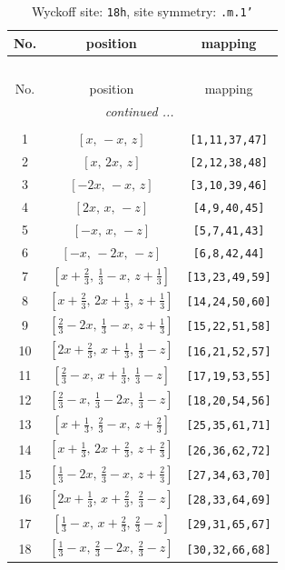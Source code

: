 \documentclass[fleqn,8pt]{jsarticle}
\begin{document}
\renewcommand{\arraystretch}{1.2}
\begin{longtable}{ccc}
\caption{Wyckoff site: {\tt 18h}, site symmetry: {\tt .m.1'}}
 \\
 \hline \hline
No. & position & mapping \\ \hline \endfirsthead

\multicolumn{2}{l}{\tablename\ \thetable{}} \\
 \hline \hline
No. & position & mapping \\ \hline \endhead

 \hline \hline
\multicolumn{2}{r}{\footnotesize\it continued ...} \\ \endfoot

 \hline \hline
\multicolumn{2}{r}{} \\ \endlastfoot

1 & $\left[ x,\, - x,\, z \right]$ & {\tt [1,11,37,47]} \\ \hline
2 & $\left[ x,\, 2 x,\, z \right]$ & {\tt [2,12,38,48]} \\ \hline
3 & $\left[ - 2 x,\, - x,\, z \right]$ & {\tt [3,10,39,46]} \\ \hline
4 & $\left[ 2 x,\, x,\, - z \right]$ & {\tt [4,9,40,45]} \\ \hline
5 & $\left[ - x,\, x,\, - z \right]$ & {\tt [5,7,41,43]} \\ \hline
6 & $\left[ - x,\, - 2 x,\, - z \right]$ & {\tt [6,8,42,44]} \\ \hline
7 & $\left[ x + \frac{2}{3},\, \frac{1}{3} - x,\, z + \frac{1}{3} \right]$ & {\tt [13,23,49,59]} \\ \hline
8 & $\left[ x + \frac{2}{3},\, 2 x + \frac{1}{3},\, z + \frac{1}{3} \right]$ & {\tt [14,24,50,60]} \\ \hline
9 & $\left[ \frac{2}{3} - 2 x,\, \frac{1}{3} - x,\, z + \frac{1}{3} \right]$ & {\tt [15,22,51,58]} \\ \hline
10 & $\left[ 2 x + \frac{2}{3},\, x + \frac{1}{3},\, \frac{1}{3} - z \right]$ & {\tt [16,21,52,57]} \\ \hline
11 & $\left[ \frac{2}{3} - x,\, x + \frac{1}{3},\, \frac{1}{3} - z \right]$ & {\tt [17,19,53,55]} \\ \hline
12 & $\left[ \frac{2}{3} - x,\, \frac{1}{3} - 2 x,\, \frac{1}{3} - z \right]$ & {\tt [18,20,54,56]} \\ \hline
13 & $\left[ x + \frac{1}{3},\, \frac{2}{3} - x,\, z + \frac{2}{3} \right]$ & {\tt [25,35,61,71]} \\ \hline
14 & $\left[ x + \frac{1}{3},\, 2 x + \frac{2}{3},\, z + \frac{2}{3} \right]$ & {\tt [26,36,62,72]} \\ \hline
15 & $\left[ \frac{1}{3} - 2 x,\, \frac{2}{3} - x,\, z + \frac{2}{3} \right]$ & {\tt [27,34,63,70]} \\ \hline
16 & $\left[ 2 x + \frac{1}{3},\, x + \frac{2}{3},\, \frac{2}{3} - z \right]$ & {\tt [28,33,64,69]} \\ \hline
17 & $\left[ \frac{1}{3} - x,\, x + \frac{2}{3},\, \frac{2}{3} - z \right]$ & {\tt [29,31,65,67]} \\ \hline
18 & $\left[ \frac{1}{3} - x,\, \frac{2}{3} - 2 x,\, \frac{2}{3} - z \right]$ & {\tt [30,32,66,68]} \\
\end{longtable}
\end{document}
